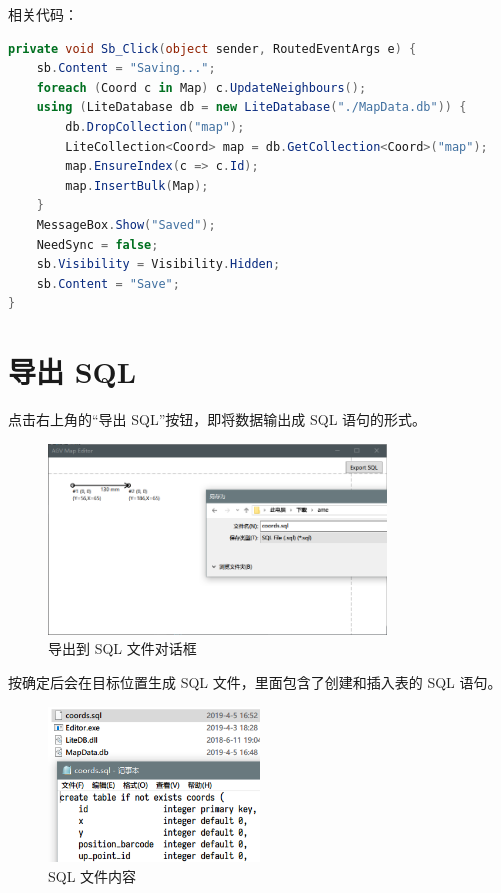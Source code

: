 相关代码：

\begin{lstlisting}[language=cs]
private void Sb_Click(object sender, RoutedEventArgs e) {
    sb.Content = "Saving...";
    foreach (Coord c in Map) c.UpdateNeighbours();
    using (LiteDatabase db = new LiteDatabase("./MapData.db")) {
        db.DropCollection("map");
        LiteCollection<Coord> map = db.GetCollection<Coord>("map");
        map.EnsureIndex(c => c.Id);
        map.InsertBulk(Map);
    }
    MessageBox.Show("Saved");
    NeedSync = false;
    sb.Visibility = Visibility.Hidden;
    sb.Content = "Save";
}
\end{lstlisting}

\section{导出 SQL}

点击右上角的``导出 SQL''按钮，即将数据输出成 SQL 语句的形式。

\begin{figure}[H]
  \centering
  \includegraphics[width=0.8\textwidth]{assets/export.png}
  \caption{导出到 SQL 文件对话框}
  \label{fig:export}
\end{figure}

按确定后会在目标位置生成 SQL 文件，里面包含了创建和插入表的 SQL 语句。

\begin{figure}[H]
  \centering
  \includegraphics[width=0.5\textwidth]{assets/sql.png}
  \caption{SQL 文件内容}
  \label{fig:sql}
\end{figure}

